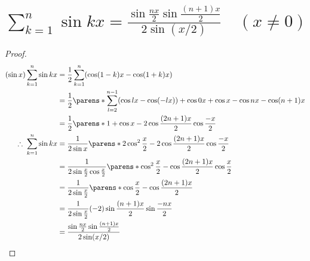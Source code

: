     \section{\texorpdfstring{$\sum_{k=1}^n \sin kx = \frac{\sin\frac{nx}{2}\sin\frac{(n+1)x}{2}}{2\sin(x/2)} \quad (x\neq 0)$}{Σ\_\{k=1\}\string^n sin(kx) = (sin(nx/2)sin((n+1)x/2))/(2sin(x/2))}}
        \begin{proof}
            \begin{align*}
                (\sin x) \sum_{k=1}^n \sin kx &= \frac{1}{2}\sum_{k=1}^n (\cos(1-k)x-\cos(1+k)x) \\
                &= \frac{1}{2}\parens*{\sum_{l=2}^{n-1}(\cos lx - \cos(-lx)) + \cos 0x + \cos x - \cos nx - \cos (n+1)x } \\
                &= \frac{1}{2}\parens*{1 + \cos x - 2\cos\frac{(2n+1)x}{2}\cos\frac{-x}{2}} \\
                \therefore\; \sum_{k=1}^n \sin kx &= \frac{1}{2\sin x}\parens*{2\cos^2\frac{x}{2} - 2\cos\frac{(2n+1)x}{2}\cos\frac{-x}{2}} \\
                &= \frac{1}{2\sin\frac{x}{2}\cos\frac{x}{2}}\parens*{\cos^2\frac{x}{2} - \cos\frac{(2n+1)x}{2}\cos\frac{x}{2}} \\
                &= \frac{1}{2\sin\frac{x}{2}}\parens*{\cos\frac{x}{2} - \cos\frac{(2n+1)x}{2}} \\
                &= \frac{1}{2\sin\frac{x}{2}}(-2)\sin\frac{(n+1)x}{2}\sin\frac{-nx}{2} \\
                &= \frac{\sin\frac{nx}{2}\sin\frac{(n+1)x}{2}}{2\sin(x/2)}
            \end{align*}
        \end{proof}